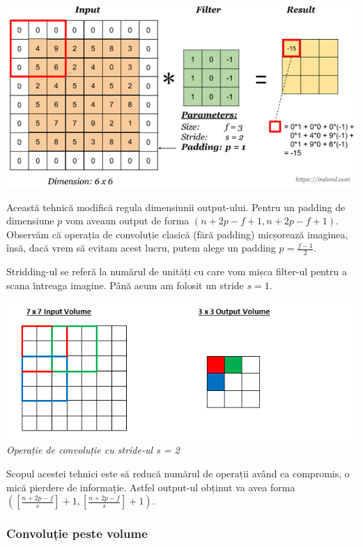 \begin{center}
\includegraphics[scale=0.7]{padding}
\end{center}

Această tehnică modifică regula dimensiunii output-ului. Pentru un padding de dimensiune $p$ vom aveaun output de forma $(n+2p-f+1, n+2p-f+1)$. Observăm că operația de convoluție clasică (fără padding) micșorează imaginea, însă, dacă vrem să evitam acest lucru, putem alege un padding $\displaystyle{p=\frac{f-1}{2}}$.

Stridding-ul se referă la numărul de unități cu care vom mișca filter-ul pentru a scana întreaga imagine. Până acum am folosit un stride $s=1$.

\begin{center}
\includegraphics[scale=1]{stride} \\
\textit{Operație de convoluție cu stride-ul s = 2}
\end{center}

Scopul acestei tehnici este să reducă numărul de operații având ca compromis, o mică pierdere de informație. Astfel output-ul obținut va avea forma $\displaystyle{\left(\displaystyle{\left[\frac{n+2p-f}{s}\right]}+1, \displaystyle{\left[\frac{n+2p-f}{s}\right]}+1\right)}$.

\subsubsection{Convoluție peste volume}

